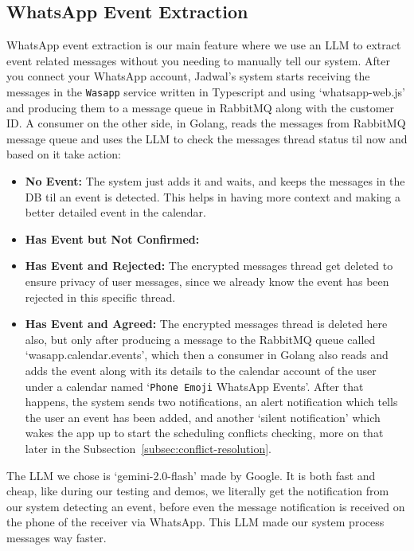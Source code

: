 \subsection{WhatsApp Event Extraction}
\label{subsec:whatsapp-event-extraction}
WhatsApp event extraction is our main feature where we use an LLM to extract event related messages without you needing to manually tell our system. After you connect your WhatsApp account, Jadwal's system starts receiving the messages in the \texttt{Wasapp} service written in Typescript and using `whatsapp-web.js' and producing them to a message queue in RabbitMQ along with the customer ID. A consumer on the other side, in Golang, reads the messages from RabbitMQ message queue and uses the LLM to check the messages thread status til now and based on it take action:
\begin{itemize}
    \item \textbf{No Event:} The system just adds it and waits, and keeps the messages in the DB til an event is detected. This helps in having more context and making a better detailed event in the calendar.
    \item \textbf{Has Event but Not Confirmed:} 
    \item \textbf{Has Event and Rejected:} The encrypted messages thread get deleted to ensure privacy of user messages, since we already know the event has been rejected in this specific thread.
    \item \textbf{Has Event and Agreed:} The encrypted messages thread is deleted here also, but only after producing a message to the RabbitMQ queue called `wasapp.calendar.events', which then a consumer in Golang also reads and adds the event along with its details to the calendar account of the user under a calendar named `\texttt{Phone Emoji} WhatsApp Events'. After that happens, the system sends two notifications, an alert notification which tells the user an event has been added, and another `silent notification' which wakes the app up to start the scheduling conflicts checking, more on that later in the Subsection~\ref{subsec:conflict-resolution}.
\end{itemize}

The LLM we chose is `gemini-2.0-flash' made by Google. It is both fast and cheap, like during our testing and demos, we literally get the notification from our system detecting an event, before even the message notification is received on the phone of the receiver via WhatsApp. This LLM made our system process messages way faster.

